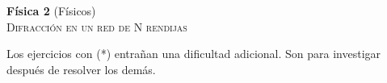 \documentclass[11pt,spanish,a4paper]{article}
\begin{document}
\begin{center}
	\textbf{Física 2} (Físicos) \hfill {}\\
	\textsc{\LARGE Difracción en un red de N rendijas}
\end{center}

Los ejercicios con (*) entrañan una dificultad adicional. Son para investigar después de resolver los demás.


\begin{enumerate}




\end{enumerate}
\end{document}
